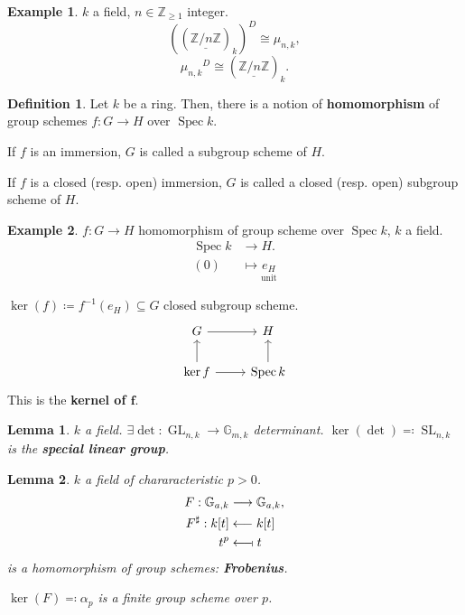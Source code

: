 \documentclass[12pt]{article}
\DeclareMathOperator{\Spec}{Spec}
\DeclareMathOperator{\GL}{GL}
\DeclareMathOperator{\SL}{SL}
\newtheorem*{lemma}{Lemma}
\theoremstyle{definition}
\newtheorem*{definition}{Definition}
\newtheorem*{example}{Example}
\begin{document}
\begin{example}
$k$ a field, $n\in\mathbb{Z}_{\geq1}$ integer.
\[\left((\underline{\mathbb{Z}/n\mathbb{Z}})_k\right)^D\cong\mu_{n,k},\]
\[{\mu_{n,k}}^D\cong(\underline{\mathbb{Z}/n\mathbb{Z}})_k.\]
\end{example}

\begin{definition}
Let $k$ be a ring. Then, there is a notion of \textbf{homomorphism} of group schemes $f:G\rightarrow H$ over $\Spec k$.

If $f$ is an immersion, $G$ is called a subgroup scheme of $H$.

If $f$ is a closed (resp. open) immersion, $G$ is called a closed (resp. open) subgroup scheme of $H$.
\end{definition}

\begin{example}
$f:G\rightarrow H$ homomorphism of group scheme over $\Spec k$, $k$ a field.
\begin{align*}
\Spec k&\longrightarrow H.\\
(0)&\longmapsto\underset{\text{unit}}{e_H}
\end{align*}

$\ker(f)\coloneqq f^{-1}(e_H)\subseteq G$ closed subgroup scheme.
\[
\begin{tikzcd}
G\arrow[r]&H\\
\ker f\arrow[u]\arrow[r]&\Spec k\arrow[u]
\end{tikzcd}
\]
This is the \textbf{kernel of $\boldsymbol{f}$}.
\end{example}

\begin{lemma}
$k$ a field. $\exists\det:\GL_{n,k}\rightarrow\mathbb{G}_{m,k}$ determinant. $\ker(\det)\eqqcolon\SL_{n,k}$ is the \textbf{special linear group}.
\end{lemma}

\begin{lemma}
$k$ a field of chararacteristic $p>0$.
\begin{align*}
F:\mathbb{G}_{a,k}&\longrightarrow\mathbb{G}_{a,k},\\
F^{\sharp}:k[t]&\longleftarrow k[t]\\
t^p&\longleftarrow\!\shortmid t
\end{align*}
is a homomorphism of group schemes: \textbf{Frobenius}.

$\ker(F)\eqqcolon\alpha_p$ is a finite group scheme over $p$.
\end{lemma}
\end{document}
